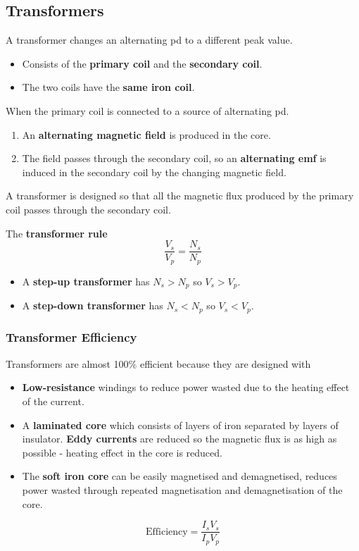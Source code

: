\subsection{Transformers}

A transformer changes an alternating pd to a different peak value.
\begin{itemize}
    \item Consists of the \textbf{primary coil} and the \textbf{secondary coil}.
    \item The two coils have the \textbf{same iron coil}.
\end{itemize}

When the primary coil is connected to a source of alternating pd.
\begin{enumerate}
    \item An \textbf{alternating magnetic field} is produced in the core.
    \item The field passes through the secondary coil, so an \textbf{alternating emf} is induced in the secondary coil by the changing magnetic field.
\end{enumerate}

A transformer is designed so that all the magnetic flux produced by the primary coil passes through the secondary coil.

The \textbf{transformer rule}
$$\frac{V_s}{V_p}=\frac{N_s}{N_p}$$
\begin{itemize}
    \item A \textbf{step-up transformer} has $N_s>N_p$ so $V_s>V_p$.
    \item A \textbf{step-down transformer} has $N_s<N_p$ so $V_s<V_p$.
\end{itemize}

\subsubsection*{Transformer Efficiency}

Transformers are almost 100\% efficient because they are designed with
\begin{itemize}
    \item \textbf{Low-resistance} windings to reduce power wasted due to the heating effect of the current.
    \item A \textbf{laminated core} which consists of layers of iron separated by layers of insulator. \textbf{Eddy currents} are reduced so the magnetic flux is as  high as possible - heating effect in the core is reduced.
    \item The \textbf{soft iron core} can be easily magnetised and demagnetised, reduces power wasted through repeated magnetisation and demagnetisation of the core.
\end{itemize}
$$\text{Efficiency}=\frac{I_sV_s}{I_pV_p}$$

